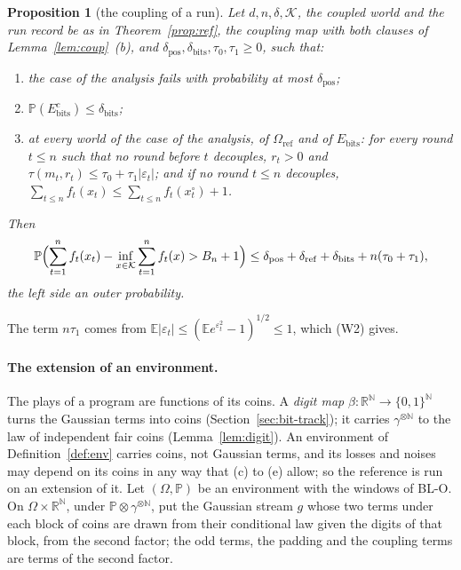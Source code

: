 \documentclass[11pt]{amsart}
\newtheorem{proposition}[theorem]{Proposition}
\theoremstyle{definition}
\numberwithin{equation}{section}
\newcommand{\R}{\mathbb{R}}
\newcommand{\E}{\mathbb{E}}
\newcommand{\Prob}{\mathbb{P}}
\newcommand{\cK}{\mathcal{K}}
\begin{document}
\begin{proposition}[the coupling of a run]\label{prop:shadow}
Let $d,n,\delta,\cK$, the coupled world and the run record be as in Theorem~\ref{prop:ref}, the coupling map with both clauses of Lemma~\ref{lem:coup}~(b), and $\delta_{\mathrm{pos}},\delta_{\mathrm{bits}},\tau_0,\tau_1\ge0$, such that:
\begin{enumerate}[label=(A\arabic*)]
\item the case of the analysis fails with probability at most $\delta_{\mathrm{pos}}$;
\item $\Prob(E_{\mathrm{bits}}^c)\le\delta_{\mathrm{bits}}$;
\item at every world of the case of the analysis, of $\Omega_{\mathrm{ref}}$ and of $E_{\mathrm{bits}}$: for every round $t\le n$ such that no round before $t$ decouples, $r_t>0$ and $\tau(m_t,r_t)\le\tau_0+\tau_1|\varepsilon_t|$; and if no round $t\le n$ decouples, $\sum_{t\le n}f_t(x_t)\le\sum_{t\le n}f_t(x^\circ_t)+1$.
\end{enumerate}
Then
\[
\Prob\Bigl(\sum_{t=1}^nf_t(x_t)-\inf_{x\in\cK}\sum_{t=1}^nf_t(x)>B_n+1\Bigr)\le\delta_{\mathrm{pos}}+\delta_{\mathrm{ref}}+\delta_{\mathrm{bits}}+n(\tau_0+\tau_1),
\]
the left side an outer probability.
\end{proposition}

The term $n\tau_1$ comes from $\E|\varepsilon_t|\le(\E e^{\varepsilon_t^2}-1)^{1/2}\le1$, which (W2) gives.

\paragraph{The extension of an environment.} The plays of a program are functions of its coins. A \emph{digit map} $\beta:\R^{\mathbb N}\to\{0,1\}^{\mathbb N}$ turns the Gaussian terms into coins (Section~\ref{sec:bit-track}); it carries $\gamma^{\otimes\mathbb N}$ to the law of independent fair coins (Lemma~\ref{lem:digit}). An environment of Definition~\ref{def:env} carries coins, not Gaussian terms, and its losses and noises may depend on its coins in any way that (c) to (e) allow; so the reference is run on an extension of it. Let $(\Omega,\Prob)$ be an environment with the windows of BL-O. On $\Omega\times\R^{\mathbb N}$, under $\Prob\otimes\gamma^{\otimes\mathbb N}$, put the Gaussian stream $g$ whose two terms under each block of coins are drawn from their conditional law given the digits of that block, from the second factor; the odd terms, the padding and the coupling terms are terms of the second factor.
\end{document}
